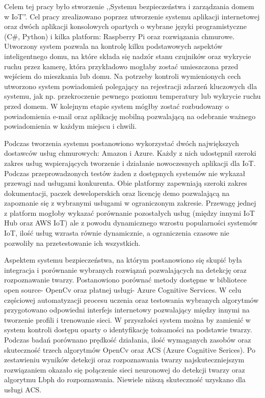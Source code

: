 Celem tej pracy było stworzenie ,,Systemu bezpieczeństwa i zarządzania domem w IoT''. Cel pracy zrealizowano poprzez utworzenie systemu aplikacji internetowej oraz dwóch aplikacji konsolowych opartych o wybrane języki programistyczne (C\#, Python) i kilka platform: Raspberry Pi oraz rozwiązania chmurowe.
Utworzony system pozwala na kontrolę kilku podstawowych aspektów inteligentnego domu, na które składa się nadzór stanu czujników oraz wykrycie ruchu przez kamerę, która przykładowo mogłaby zostać umieszczona przed wejściem do mieszkania lub domu.
Na potrzeby kontroli wymienionych cech utworzono system powiadomień polegający na rejestracji zdarzeń kluczowych dla systemu, jak np. przekroczenie pewnego poziomu temperatury lub wykrycie ruchu przed domem. W kolejnym etapie system mógłby zostać rozbudowany o powiadomienia e-mail oraz aplikację mobilną pozwalającą na odebranie ważnego powiadomienia w każdym miejscu i chwili.

Podczas tworzenia systemu postanowiono wykorzystać dwóch największych dostawców usług chmurowych: Amazon i Azure. Każdy z nich udostępnił szeroki zakres usług wspierających tworzenie i działanie nowoczesnych aplikacji dla IoT. Podczas przeprowadzonych testów żaden z dostępnych systemów nie wykazał przewagi nad usługami konkurenta. Obie platformy zapewniają szeroki zakres dokumentacji, paczek deweloperskich oraz licencję demo pozwalającą na zapoznanie się z wybranymi usługami w ograniczonym zakresie. Przewagę jednej z platform mogłoby wykazać porównanie pozostałych usług (między innymi IoT Hub oraz AWS IoT) ale z powodu dynamicznego wzrostu popularności systemów IoT, ilość usług wzrasta równie dynamicznie, a ograniczenia czasowe nie pozwoliły na przetestowanie ich wszystkich.

Aspektem systemu bezpieczeństwa, na którym postanowiono się skupić była integracja i porównanie wybranych rozwiązań pozwalających na detekcję oraz rozpoznawanie twarzy. Postanowiono porównać metody dostępne w bibliotece open source- OpenCv oraz płatnej usługi- Azure Cognitive Services. W celu częściowej automatyzacji procesu uczenia oraz testowania wybranych algorytmów przygotowano odpowiedni interfejs internetowy pozwalający między innymi na tworzenie profili i trenowanie sieci. W przyszłości system można by zamienić w system kontroli dostępu oparty o identyfikację tożsamości na podstawie twarzy. Podczas badań porównano prędkość działania, ilość wymaganych zasobów oraz skuteczność trzech algorytmów OpenCv oraz ACS (Azure Cognitive Serices). Po zestawieniu wyników detekcji oraz rozpoznawania twarzy najskuteczniejszym rozwiązaniem okazało się połączenie sieci neuronowej do detekcji twarzy oraz algorytmu Lbph do rozpoznawania. Niewiele niższą skuteczność uzyskano dla usługi ACS. 

